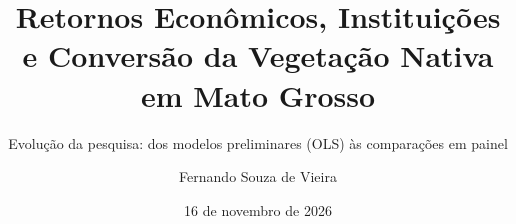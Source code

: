 \documentclass[aspectratio=169,10.5pt]{beamer}
\title[Efeitos Fixos e Interações de Mercado]{Retornos Econômicos, Instituições e Conversão da Vegetação Nativa em Mato Grosso}
\subtitle{Evolução da pesquisa: dos modelos preliminares (OLS) às comparações em painel}
\author{Fernando Souza de Vieira}
\institute{Tópicos em Microeconomia Aplicada}
\date{16 de novembro de 2026}
\begin{document}
\begin{frame}
\titlepage
\end{frame}

\end{document}
